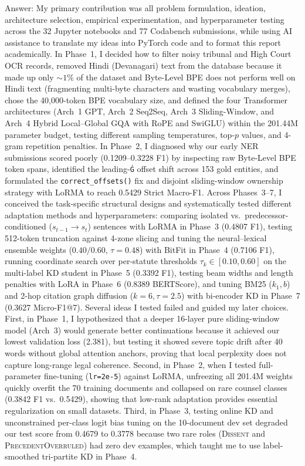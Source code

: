 \documentclass[11pt, oneside]{article}
\begin{document}
Answer: My primary contribution was all problem formulation, ideation, architecture selection, empirical experimentation, and hyperparameter testing across the 32 Jupyter notebooks and 77 Codabench submissions, while using AI assistance to translate my ideas into PyTorch code and to format this report academically. In Phase~1, I decided how to filter noisy tribunal and High Court OCR records, removed Hindi (Devanagari) text from the database because it made up only $\sim 1\%$ of the dataset and Byte-Level BPE does not perform well on Hindi text (fragmenting multi-byte characters and wasting vocabulary merges), chose the 40,000-token BPE vocabulary size, and defined the four Transformer architectures (Arch~1 GPT, Arch~2 Seq2Seq, Arch~3 Sliding-Window, and Arch~4 Hybrid Local--Global GQA with RoPE and SwiGLU) within the 201.44M parameter budget, testing different sampling temperatures, top-$p$ values, and 4-gram repetition penalties. In Phase~2, I diagnosed why our early NER submissions scored poorly (0.1209--0.3228 F1) by inspecting raw Byte-Level BPE token spans, identified the leading-\texttt{Ġ} offset shift across 153 gold entities, and formulated the \texttt{correct\_offsets()} fix and disjoint sliding-window ownership strategy with LoRMA to reach 0.5429 Strict Macro-F1. Across Phases~3--7, I conceived the task-specific structural designs and systematically tested different adaptation methods and hyperparameters: comparing isolated vs.\ predecessor-conditioned ($s_{t-1}\to s_t$) sentences with LoRMA in Phase~3 (0.4807 F1), testing 512-token truncation against 4-zone slicing and tuning the neural--lexical ensemble weights ($0.40/0.60$, $\tau=0.48$) with BitFit in Phase~4 (0.7106 F1), running coordinate search over per-statute thresholds $\tau_k \in [0.10, 0.60]$ on the multi-label KD student in Phase~5 (0.3392 F1), testing beam widths and length penalties with LoRA in Phase~6 (0.8389 BERTScore), and tuning BM25 ($k_1, b$) and 2-hop citation graph diffusion ($k=6, \tau=2.5$) with bi-encoder KD in Phase~7 (0.3627 Micro-F1@7). Several ideas I tested failed and guided my later choices. First, in Phase~1, I hypothesized that a deeper 16-layer pure sliding-window model (Arch~3) would generate better continuations because it achieved our lowest validation loss (2.381), but testing it showed severe topic drift after 40 words without global attention anchors, proving that local perplexity does not capture long-range legal coherence. Second, in Phase~2, when I tested full-parameter fine-tuning (\texttt{lr=2e-5}) against LoRMA, unfreezing all 201.4M weights quickly overfit the 70 training documents and collapsed on rare counsel classes (0.3842 F1 vs.\ 0.5429), showing that low-rank adaptation provides essential regularization on small datasets. Third, in Phase~3, testing online KD and unconstrained per-class logit bias tuning on the 10-document dev set degraded our test score from 0.4679 to 0.3778 because two rare roles (\textsc{Dissent} and \textsc{PrecedentOverruled}) had zero dev examples, which taught me to use label-smoothed tri-partite KD in Phase~4.
\end{document}
